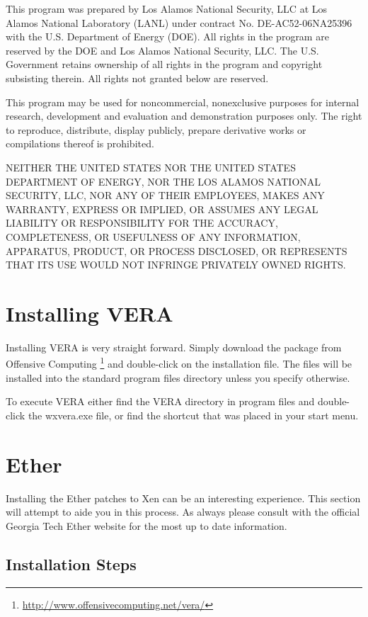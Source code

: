 \documentclass[11pt]{article}
\begin{document}
This program was prepared by Los Alamos National Security, LLC at Los
Alamos National Laboratory (LANL) under contract No. DE-AC52-06NA25396
with the U.S. Department of Energy (DOE). All rights in the program
are reserved by the DOE and Los Alamos National Security, LLC. The
U.S. Government retains ownership of all rights in the program and
copyright subsisting therein. All rights not granted below are
reserved. 

This program may be used for noncommercial, nonexclusive purposes for
internal research, development and evaluation and demonstration
purposes only. The right to reproduce, distribute, display publicly,
prepare derivative works or compilations thereof is prohibited.

NEITHER THE UNITED STATES NOR THE UNITED STATES DEPARTMENT OF ENERGY,
NOR THE LOS ALAMOS NATIONAL SECURITY, LLC, NOR ANY OF THEIR EMPLOYEES,
MAKES ANY WARRANTY, EXPRESS OR IMPLIED, OR ASSUMES ANY LEGAL LIABILITY
OR RESPONSIBILITY FOR THE ACCURACY, COMPLETENESS, OR USEFULNESS OF ANY
INFORMATION, APPARATUS, PRODUCT, OR PROCESS DISCLOSED, OR REPRESENTS
THAT ITS USE WOULD NOT INFRINGE PRIVATELY OWNED RIGHTS.

\section{Installing VERA}

Installing VERA is very straight forward. Simply download the package
from Offensive Computing
\footnote{\url{http://www.offensivecomputing.net/vera/}} and
double-click on the installation file. The files will be installed
into the standard program files directory unless you specify
otherwise. 

To execute VERA either find the VERA directory in program files and
double-click the wxvera.exe file, or find the shortcut that was placed
in your start menu. 

\section{Ether}

Installing the Ether patches to Xen can be an interesting
experience. This section will attempt to aide you in this process. As
always please consult with the official Georgia Tech Ether website for
the most up to date information.

\subsection{Installation Steps}
\end{document}
